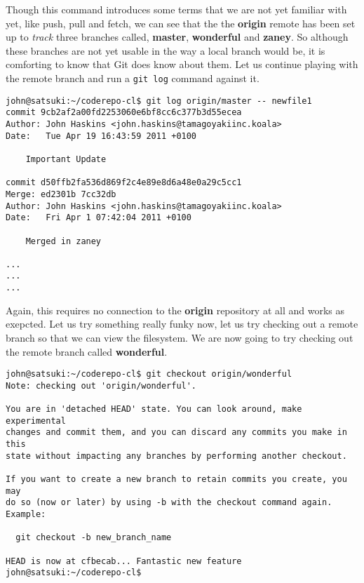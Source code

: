Though this command introduces some terms that we are not yet familiar with yet, like push, pull and fetch, we can see that the the \textbf{origin} remote has been set up to \emph{track} three branches called, \textbf{master}, \textbf{wonderful} and \textbf{zaney}.  So although these branches are not yet usable in the way a local branch would be, it is comforting to know that Git does know about them.  Let us continue playing with the remote branch and run a \texttt{git log} command against it.

\begin{Verbatim}[frame=leftline,framerule=1mm,fontsize=\relsize{-3}] 
john@satsuki:~/coderepo-cl$ git log origin/master -- newfile1
commit 9cb2af2a00fd2253060e6bf8cc6c377b3d55ecea
Author: John Haskins <john.haskins@tamagoyakiinc.koala>
Date:   Tue Apr 19 16:43:59 2011 +0100

    Important Update

commit d50ffb2fa536d869f2c4e89e8d6a48e0a29c5cc1
Merge: ed2301b 7cc32db
Author: John Haskins <john.haskins@tamagoyakiinc.koala>
Date:   Fri Apr 1 07:42:04 2011 +0100

    Merged in zaney

...
...
...
\end{Verbatim}

Again, this requires no connection to the \textbf{origin} repository at all and works as exepcted.  Let us try something really funky now, let us try checking out a remote branch so that we can view the filesystem.  We are now going to try checking out the remote branch called \textbf{wonderful}.

\begin{Verbatim}[frame=leftline,framerule=1mm,fontsize=\relsize{-3}] 
john@satsuki:~/coderepo-cl$ git checkout origin/wonderful
Note: checking out 'origin/wonderful'.

You are in 'detached HEAD' state. You can look around, make experimental
changes and commit them, and you can discard any commits you make in this
state without impacting any branches by performing another checkout.

If you want to create a new branch to retain commits you create, you may
do so (now or later) by using -b with the checkout command again. Example:

  git checkout -b new_branch_name

HEAD is now at cfbecab... Fantastic new feature
john@satsuki:~/coderepo-cl$ 
\end{Verbatim}

